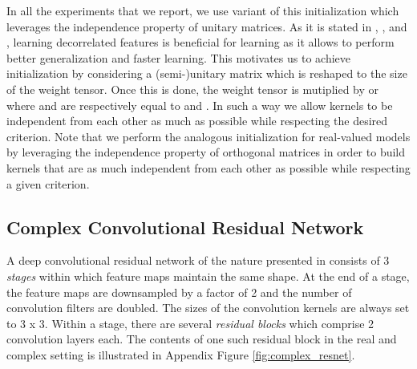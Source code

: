\documentclass{article}
\begin{document}
In all the experiments that we report, we use variant of this initialization which leverages the independence property of unitary matrices. As it is stated in \citet{cogswell2015reducing}, \citet{srivastava2014dropout}, and \citet{tompson2015efficient}, learning decorrelated features is beneficial for learning as it allows to perform better generalization and faster learning. This motivates us to achieve initialization by considering a (semi-)unitary matrix which is reshaped to the size of the weight tensor. Once this is done, the weight tensor is mutiplied by  or  where  and  are respectively equal to  and . In such a way we allow kernels to be independent from each other as much as possible while respecting the desired criterion. Note that we perform the analogous initialization for real-valued models by leveraging the independence property of orthogonal matrices in order to build kernels that are as much independent from each other as possible while respecting a given criterion. 

\subsection{Complex Convolutional Residual Network} \label{ccrn}

A deep convolutional residual network of the nature presented in \cite{he2015deep,he2016identity} consists of 3 \textit{stages} within which feature maps maintain the same shape. At the end of a stage, the feature maps are downsampled by a factor of 2 and the number of convolution filters are doubled. The sizes of the convolution kernels are always set to 3 x 3. Within a stage, there are several \textit{residual blocks} which comprise 2 convolution layers each. The contents of one such residual block in the real and complex setting is illustrated in Appendix Figure \ref{fig:complex_resnet}.
\end{document}
